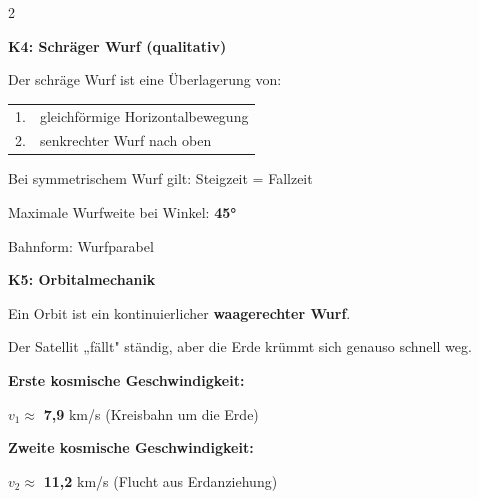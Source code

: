 \documentclass[10pt, a4paper]{article}
\newcommand{\fachfarbe}{physik}
\newcommand{\lsg}[1]{\textcolor{loesung}{\textbf{#1}}}
\newcommand{\abschnitt}[1]{%
    \vspace{4pt}
    \noindent\textbf{\textcolor{\fachfarbe}{#1}}
    \vspace{2pt}
}
\begin{document}

\newpage

\begin{multicols}{2}
\small


\abschnitt{K4: Schräger Wurf (qualitativ)}

\begin{merkbox}
Der schräge Wurf ist eine Überlagerung von:

\vspace{4pt}
\begin{tabular}{@{}rl@{}}
1. & gleichförmige Horizontalbewegung \\[6pt]
2. & senkrechter Wurf nach oben \\
\end{tabular}

\vspace{8pt}
Bei symmetrischem Wurf gilt: Steigzeit = Fallzeit

\vspace{8pt}
Maximale Wurfweite bei Winkel: \lsg{45°}

\vspace{8pt}
Bahnform: Wurfparabel
\end{merkbox}

\vspace{4pt}


\abschnitt{K5: Orbitalmechanik}

\begin{merkbox}
Ein Orbit ist ein kontinuierlicher \textbf{waagerechter Wurf}.

Der Satellit „fällt" ständig, aber die Erde krümmt sich genauso schnell weg.

\vspace{8pt}
\textbf{Erste kosmische Geschwindigkeit:}

$v_1 \approx$ \lsg{7,9} km/s \quad (Kreisbahn um die Erde)

\vspace{6pt}
\textbf{Zweite kosmische Geschwindigkeit:}

$v_2 \approx$ \lsg{11,2} km/s \quad (Flucht aus Erdanziehung)
\end{merkbox}


\end{multicols}
\end{document}
